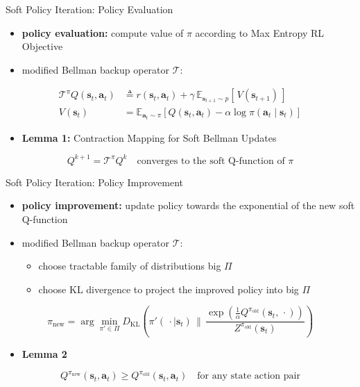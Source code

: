 \begin{frame}{Soft Policy Iteration: Policy Evaluation}
\begin{itemize}
    \item \textbf{policy evaluation:} compute value of $\pi$ according to Max Entropy RL Objective
    \item modified Bellman backup operator $\mathcal{T}$:
\end{itemize}
\begin{align*}
\mathcal{T}^{\pi} Q(\mathbf{s}_t, \mathbf{a}_t) &\triangleq r(\mathbf{s}_t, \mathbf{a}_t) + \gamma\, \mathbb{E}_{\mathbf{s}_{t+1} \sim p}\!\left[\, \boxed{V(\mathbf{s}_{t+1})}\, \right] \\
\boxed{V(\mathbf{s}_t)} &= \mathbb{E}_{\mathbf{a}_t \sim \pi}\!\left[ Q(\mathbf{s}_t, \mathbf{a}_t) - \boxed{\alpha \log \pi(\mathbf{a}_t \mid \mathbf{s}_t)} \right]
\end{align*}
\begin{itemize}
    \item \textbf{Lemma 1:} Contraction Mapping for Soft Bellman Updates
\end{itemize}
\[
Q^{k+1} = \mathcal{T}^{\pi} Q^{k} \quad \text{converges to the soft Q-function of } \pi
\]
\end{frame}
\begin{frame}{Soft Policy Iteration: Policy Improvement}
\begin{itemize}
    \item \textbf{policy improvement:} update policy towards the exponential of the new soft Q-function
    \item modified Bellman backup operator $\mathcal{T}$:
    \begin{itemize}
        \item choose tractable family of distributions big $\Pi$
        \item choose KL divergence to project the improved policy into big $\Pi$
    \end{itemize}
\end{itemize}
\[
\pi_{\text{new}} = \arg\min_{\pi' \in \Pi} D_{\mathrm{KL}}\!\left( \pi'(\,\cdot \mid \mathbf{s}_t) \,\Big\|\, \frac{\exp\!\left( \tfrac{1}{\alpha} Q^{\pi_{\text{old}}}(\mathbf{s}_t, \,\cdot)\right)}{Z^{\pi_{\text{old}}}(\mathbf{s}_t)} \right)
\]
\begin{itemize}
    \item \textbf{Lemma 2}
\end{itemize}
\[
Q^{\pi_{\text{new}}}(\mathbf{s}_t, \mathbf{a}_t) \geq Q^{\pi_{\text{old}}}(\mathbf{s}_t, \mathbf{a}_t) \quad \text{for any state action pair}
\]
\end{frame}
